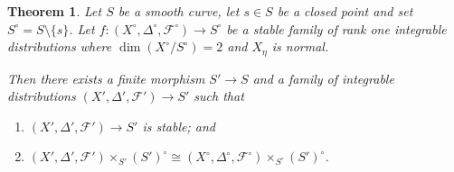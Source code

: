 \documentclass[12pt, a4paper]{amsart}
\newcounter{Theorem}
\newtheorem{theorem}{Theorem}[section]
\theoremstyle{definition}
\theoremstyle{named}
\begin{document}
\begin{theorem}
\label{thm_compactify_to_family}
Let $S$ be a smooth curve, let $s \in S$ be a closed point and set $S^\circ = S \setminus \{s\}$.  Let $f\colon (X^\circ, \Delta^\circ, \mathcal F^\circ) \rightarrow S^\circ$ be a stable
family of rank one integrable distributions where $\dim (X^\circ/S^\circ) = 2$ and $X_\eta$ is normal.


Then there exists a finite morphism $S' \rightarrow S$
and a family of integrable distributions $(X', \Delta', \mathcal F') \rightarrow S'$ such that 
\begin{enumerate}
\item $(X', \Delta', \mathcal F')\rightarrow S'$ is stable; and 

\item $(X', \Delta', \mathcal F')\times_{S'}(S')^\circ \cong (X^\circ, \Delta^\circ, \mathcal F^\circ) \times_{S^\circ}(S')^\circ$.
\end{enumerate}

\end{theorem}
\end{document}
